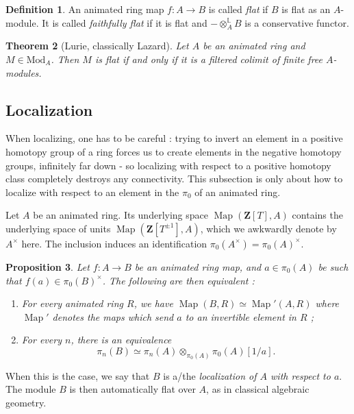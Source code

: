 \documentclass[11pt]{article}
\newtheorem{theorem}{Theorem}[section]
\newtheorem{proposition}[theorem]{Proposition}
\theoremstyle{definition}
\newtheorem{definition}[theorem]{Definition}
\renewcommand{\L}{\mathbb{L}}
\newcommand{\Map}{\operatorname{Map}}
\newcommand{\Mod}{\mathrm{Mod}}
\newcommand{\Z}{\mathbf{Z}}
\begin{document}
\begin{definition}
    An animated ring map $f : A \to B$ is called \emph{flat} if $B$ is flat as an $A$-module.
    It is called \emph{faithfully flat} if it is flat and $- \otimes_A^{\L} B$ is a conservative functor.
\end{definition}

\begin{theorem}[Lurie, classically Lazard]
    Let $A$ be an animated ring and $M \in \Mod_A$.
    Then $M$ is flat if and only if it is a filtered colimit of finite free $A$-modules.
\end{theorem}

\subsection{Localization}

When localizing, one has to be careful : trying to invert an element in a positive homotopy group of a ring forces us to create elements in the negative homotopy groups, infinitely far down - so localizing with respect to a positive homotopy class completely destroys any connectivity.
This subsection is only about how to localize with respect to an element in the $\pi_0$ of an animated ring.

Let $A$ be an animated ring.
Its underlying space $\Map(\Z[T], A)$ contains the underlying space of units $\Map(\Z[T^{\pm 1}], A)$, which we awkwardly denote by $A^{\times}$ here.
The inclusion induces an identification $\pi_0(A^{\times}) = \pi_0(A)^{\times}$.

\begin{proposition}
    Let $f : A \to B$ be an animated ring map, and $a \in \pi_0(A)$ be such that $f(a) \in \pi_0(B)^{\times}$.
    The following are then equivalent :
    \begin{enumerate}
        \item For every animated ring $R$, we have $\Map(B, R) \simeq \Map'(A, R)$ where $\Map'$ denotes the maps which send $a$ to an invertible element in $R$ ;
        \item For every $n$, there is an equivalence
        \[
            \pi_n(B) \simeq \pi_n(A) \otimes_{\pi_0(A)} \pi_0(A)[1/a].
        \]
    \end{enumerate}
\end{proposition}
When this is the case, we say that $B$ is a/the \emph{localization of $A$ with respect to $a$}.
The module $B$ is then automatically flat over $A$, as in classical algebraic geometry.
\end{document}
